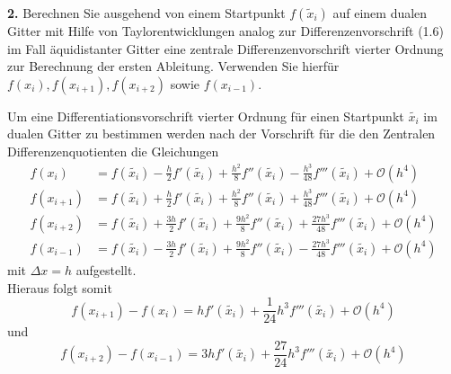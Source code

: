 \documentclass[Protokollheft.tex]{subfiles}
\begin{document}
	
	\begin{framed}
		\noindent \textbf{2.} Berechnen Sie ausgehend von einem Startpunkt \(f(\tilde{x}_i)\) auf einem dualen Gitter mit Hilfe von Taylorentwicklungen analog zur Differenzenvorschrift (1.6) im Fall äquidistanter Gitter eine zentrale Differenzenvorschrift vierter Ordnung zur Berechnung der ersten Ableitung. Verwenden Sie hierfür \(f(x_i), f(x_{i+1}), f(x_{i+2})\) sowie \(f(x_{i-1})\).\label{exer:diffquotOrd4}
	\end{framed}
	\noindent
	Um eine Differentiationsvorschrift vierter Ordnung für einen Startpunkt $\tilde{x_i}$ im dualen Gitter zu bestimmen werden nach der Vorschrift für die den Zentralen Differenzenquotienten die Gleichungen
	\begin{align}
		\label{eq:dgl}
		f({x_i}) & = f(\tilde{x_i}) - \frac{h}{2}f'(\tilde{x_i})+\frac{h^2}{8}f''(\tilde{x_i})-\frac{h^3}{48}f'''(\tilde{x_i}) + \mathcal{O}(h^4) \nonumber\\
		f({x_{i+1}}) & = f(\tilde{x_i}) + \frac{h}{2}f'(\tilde{x_i})+\frac{h^2}{8}f''(\tilde{x_i})+\frac{	h^3}{48}f'''(\tilde{x_i}) + \mathcal{O}(h^4)\\
		f({x_{i+2}}) & = f(\tilde{x_i}) + \frac{3h}{2}f'(\tilde{x_i})+\frac{9h^2}{8}f''(\tilde{x_i})+\frac{27h^3}{48}f'''(\tilde{x_i}) + \mathcal{O}(h^4) \nonumber\\
		f({x_{i-1}}) & = f(\tilde{x_i}) - \frac{3h}{2}f'(\tilde{x_i})+\frac{9h^2}{8}f''(\tilde{x_i})-\frac{27h^3}{48}f'''(\tilde{x_i}) + \mathcal{O}(h^4) \nonumber
	\end{align}
	mit $\Delta x = h$ aufgestellt. \\
	Hieraus folgt somit
	\begin{equation}
	\label{eq:LGS}
	f(x_{i+1}) - f(x_i) = hf'(\tilde{x_i}) + \frac{1}{24}h^3 f'''(\tilde{x_i})+\mathcal{O}(h^4) 
	\end{equation}
	und
	\begin{equation}
	\label{eq:LGS2}
	f(x_{i+2}) - f(x_{i-1})=3hf'(\tilde{x_i}) + \frac{27}{24}h^3f'''(\tilde{x_i}) + \mathcal{O}(h^4)
	\end{equation}
	
\end{document}
